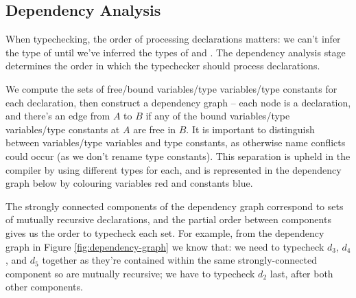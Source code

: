 \documentclass[dissertation.tex]{subfiles}
\begin{document}
{{{        }
        \subsection{Dependency Analysis}
        {

            When typechecking, the order of processing declarations matters: we can't infer the type of  until we've inferred the types of  and . The dependency analysis stage
            determines the order in which the typechecker should process declarations.

            We compute the sets of free/bound variables/type variables/type constants for each declaration, then
            construct a dependency graph -- each node is a declaration, and there's an edge from \(A\) to \(B\) if any
            of the bound variables/type variables/type constants at \(A\) are free in \(B\). It is important to
            distinguish between variables/type variables and type constants, as otherwise name conflicts could occur (as
            we don't rename type constants). This separation is upheld in the compiler by using different types for
            each, and is represented in the dependency graph below by colouring variables red and constants blue.

            The strongly connected components of the dependency graph correspond to sets of mutually recursive
            declarations, and the partial order between components gives us the order to typecheck each set. For
            example, from the dependency graph in Figure \ref{fig:dependency-graph} we know that: we need to typecheck
            \(d_3\), \(d_4\), and \(d_5\) together as they're contained within the same strongly-connected component so
            are mutually recursive; we have to typecheck \(d_2\) last, after both other components.

}}}
\end{document}
